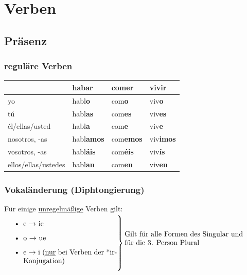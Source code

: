 \documentclass[10pt,spanish]{report}
\begin{document}
\chapter*{Verben}
\section*{Präsenz}
\subsection*{reguläre Verben}
\begin{longtable}{p{} | C{.10\textwidth}  | C{.10\textwidth}  | C{.10\textwidth}} 
\textbf{~}     & hab\textbf{ar} & com\textbf{er} & viv\textbf{ir}                                       \\ \hline
\hline
\endhead %
yo & habl\textbf{o} & com\textbf{o} & viv\textbf{o} \\
tú & habl\textbf{as} & com\textbf{es} &  viv\textbf{es} \\
él/ellas/usted &  habl\textbf{a} & com\textbf{e} &  viv\textbf{e} \\
nosotros, -as &  habl\textbf{amos} & com\textbf{emos} &  viv\textbf{imos} \\
vosotros, -as &  habl\textbf{áis} & com\textbf{éis} &  viv\textbf{ís} \\
ellos/ellas/ustedes &  habl\textbf{an} & com\textbf{en} &  viv\textbf{en} \\
\end{longtable}

\subsection*{Vokaländerung (Diphtongierung) }
Für einige \underline{unregelmäßige} Verben gilt:\\[2ex]
$
\left.\parbox{0.45\textwidth}{%
\begin{itemize}
  \item e $\rightarrow$ ie
  \item o $\rightarrow$ ue
  \item e $\rightarrow$ i (\underline{nur} bei Verben der *ir-Konjugation)
\end{itemize}
}\right\} \vbox{\noindent Gilt für alle Formen des Singular und\\für die 3. Person Plural}
$
\end{document}
